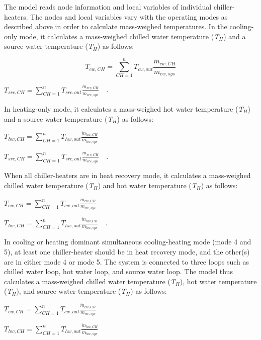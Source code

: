 The model reads node information and local variables of individual chiller-heaters. The nodes and local variables vary with the operating modes as described above in order to calculate mass-weighed temperatures. In the cooling-only mode, it calculates a mass-weighed chilled water temperature (\emph{T\(_{H}\)}) and a source water temperature (\emph{T\(_{H}\)}) as follows:

\begin{equation}
{T_{cw,CH}} = \sum\limits_{CH = 1}^n {{T_{cw,out}}} \frac{{{{\dot m}_{cw,CH}}}}{{{m_{cw,sys}}}}
\end{equation}

\textbf{\emph{\({T_{src,CH}} = \sum\limits_{CH = 1}^n {{T_{src,out}}} \frac{{{{\dot m}_{src,CH}}}}{{{m_{src,sys}}}}\) ~}}.

In heating-only mode, it calculates a mass-weighed hot water temperature (\emph{T\(_{H}\)}) and a source water temperature (\emph{T\(_{H}\)}) as follows:

\textbf{\emph{\({T_{hw,CH}} = \sum\limits_{CH = 1}^n {{T_{hw,out}}} \frac{{{{\dot m}_{hw,CH}}}}{{{m_{hw,sys}}}}\) ~}}

\textbf{\emph{\({T_{src,CH}} = \sum\limits_{CH = 1}^n {{T_{src,out}}} \frac{{{{\dot m}_{src,CH}}}}{{{m_{src,sys}}}}\) ~}}.

When all chiller-heaters are in heat recovery mode, it calculates a mass-weighed chilled water temperature (\emph{T\(_{H}\)}) and hot water temperature (\emph{T\(_{H}\)}) as follows:

\textbf{\emph{\({T_{cw,CH}} = \sum\limits_{CH = 1}^n {{T_{cw,out}}} \frac{{{{\dot m}_{cw,CH}}}}{{{m_{cw,sys}}}}\)}}

\textbf{\emph{\({T_{hw,CH}} = \sum\limits_{CH = 1}^n {{T_{hw,out}}} \frac{{{{\dot m}_{hw,CH}}}}{{{m_{hw,sys}}}}\) ~}}.

In cooling or heating dominant simultaneous cooling-heating mode (mode 4 and 5), at least one chiller-heater should be in heat recovery mode, and the other(s) are in either mode 4 or mode 5. The system is connected to three loops such as chilled water loop, hot water loop, and source water loop. The model thus calculates a mass-weighed chilled water temperature (\emph{T\(_{H}\)}), hot water temperature (\emph{T\(_{H}\)}), and source water temperature (\emph{T\(_{H}\)}) as follows:

\textbf{\emph{\({T_{cw,CH}} = \sum\limits_{CH = 1}^n {{T_{cw,out}}} \frac{{{{\dot m}_{cw,CH}}}}{{{m_{cw,sys}}}}\)}}

\textbf{\emph{\({T_{hw,CH}} = \sum\limits_{CH = 1}^n {{T_{hw,out}}} \frac{{{{\dot m}_{hw,CH}}}}{{{m_{hw,sys}}}}\)}}

